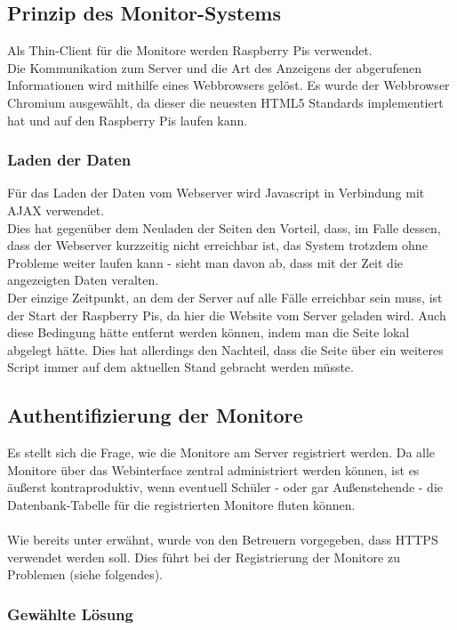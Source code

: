 \subsection{Prinzip des Monitor-Systems}

Als Thin-Client für die Monitore werden Raspberry Pis verwendet.\\
Die Kommunikation zum Server und die Art des Anzeigens der abgerufenen Informationen wird mithilfe eines Webbrowsers gelöst. Es wurde der Webbrowser Chromium ausgewählt, da dieser die neuesten HTML5 Standards implementiert hat und auf den Raspberry Pis laufen kann.

\subsubsection{Laden der Daten}

Für das Laden der Daten vom Webserver wird Javascript in Verbindung mit AJAX verwendet.\\
Dies hat gegenüber dem Neuladen der Seiten den Vorteil, dass, im Falle dessen, dass der Webserver kurzzeitig nicht erreichbar ist, das System trotzdem ohne Probleme weiter laufen kann - sieht man davon ab, dass mit der Zeit die angezeigten Daten veralten.\\
Der einzige Zeitpunkt, an dem der Server auf alle Fälle erreichbar sein muss, ist der Start der Raspberry Pis, da hier die Website vom Server geladen wird. Auch diese Bedingung hätte entfernt werden können, indem man die Seite lokal abgelegt hätte. Dies hat allerdings den Nachteil, dass die Seite über ein weiteres Script immer auf dem aktuellen Stand gebracht werden müsste.

\subsection{Authentifizierung der Monitore}
Es stellt sich die Frage, wie die Monitore am Server registriert werden. Da alle Monitore über das Webinterface zentral administriert werden können, ist es äußerst kontraproduktiv, wenn eventuell Schüler - oder gar Außenstehende - die Datenbank-Tabelle für die registrierten Monitore fluten können.\\
\\
Wie bereits unter  erwähnt, wurde von den Betreuern vorgegeben, dass HTTPS verwendet werden soll. Dies führt bei der Registrierung der Monitore zu Problemen (siehe folgendes).

\subsubsection{Gewählte Lösung}

